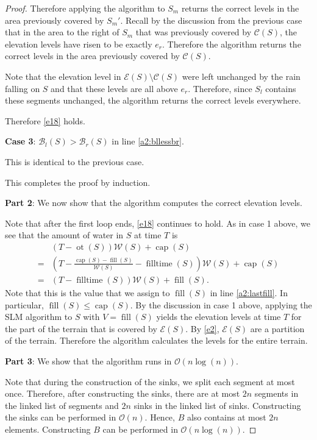 \documentclass[11pt,a4paper]{article}
\newcommand{\bO}{\mathcal{O}}
\newcommand{\Br}{\mathcal{B}_r}
\newcommand{\Bl}{\mathcal{B}_l}
\newcommand{\W}{\mathcal{W}}
\newcommand{\C}{\mathcal{C}}
\newcommand{\E}{\mathcal{E}}
\DeclareMathOperator{\capp}{cap}
\DeclareMathOperator{\ot}{ot}
\DeclareMathOperator{\Fill}{fill}
\DeclareMathOperator{\filltime}{filltime}
\begin{document}
\begin{proof}
Therefore applying the algorithm to $S_m$ returns the correct levels in the area previously covered by $S_m'$.
Recall by the discussion from the previous case that in the area to the right of $S_m$ that was previously covered by $\C(S)$, the elevation levels have risen to be exactly $e_r$.
Therefore the algorithm returns the correct levels in the area previously covered by $\C(S)$.

Note that the elevation level in $\E(S)\setminus\C(S)$ were left unchanged by the rain falling on $S$ and that these levels are all above $e_r$.
Therefore, since $S_l$ contains these segments unchanged, the algorithm returns the correct levels everywhere.

Therefore \ref{e18} holds.

\textbf{Case 3}: $\Bl(S) > \Br(S)$ in line \ref{a2:bllessbr}.

This is identical to the previous case.

This completes the proof by induction.

\textbf{Part 2}: We now show that the algorithm computes the correct elevation levels.

Note that after the first loop ends, \ref{e18} continues to hold.
As in case 1 above, we see that the amount of water in $S$ at time $T$ is
\begin{align*}
    &(T - \ot(S))\W(S) + \capp(S) \\
  = &\left(T - \frac{\capp(S) - \Fill(S)}{\W(S)} - \filltime(S)\right)\W(S) + \capp(S) \\
  = &\left(T - \filltime(S)\right)\W(S) + \Fill(S).
\end{align*}
Note that this is the value that we assign to $\Fill(S)$ in line \ref{a2:lastfill}.
In particular, $\Fill(S)\le\capp(S)$.
By the discussion in case 1 above, applying the SLM algorithm to $S$ with $V=\Fill(S)$ yields the elevation levels at time $T$ for the part of the terrain that is covered by $\E(S)$.
By \ref{e2}, $\E(S)$ are a partition of the terrain.
Therefore the algorithm calculates the levels for the entire terrain.

\textbf{Part 3}: We show that the algorithm runs in $\bO(n\log(n))$.

Note that during the construction of the sinks, we split each segment at most once.
Therefore, after constructing the sinks, there are at most $2n$ segments in the linked list of segments and $2n$ sinks in the linked list of sinks.
Constructing the sinks can be performed in $\bO(n)$.
Hence, $B$ also contains at most $2n$ elements.
Constructing $B$ can be performed in $\bO(n\log(n))$.


\end{proof}
\end{document}
